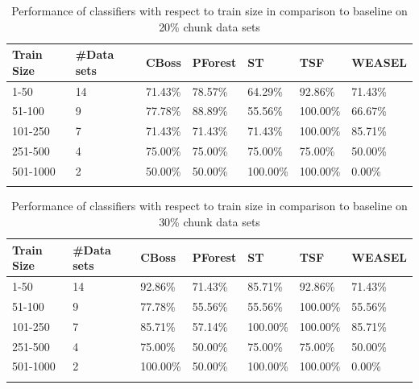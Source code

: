 \begin{table}[hp!]
	\setlength\extrarowheight{2pt} %
	\begin{tabularx}{\textwidth}{|X|X|X|X|X|X|X|}
	\hline
	\textbf{Train Size} & \textbf{\#Data sets} & \textbf{CBoss} & \textbf{PForest} & \textbf{ST} & \textbf{TSF} & \textbf{WEASEL} \\ \hline
		1-50 & 14 & 71.43\% & 78.57\% & 64.29\% & 92.86\% & 71.43\% \\ \hline
		51-100 & 9 & 77.78\% & 88.89\% & 55.56\% & 100.00\% & 66.67\% \\ \hline
		101-250 & 7 & 71.43\% & 71.43\% & 71.43\% & 100.00\% & 85.71\% \\ \hline
		251-500 & 4 & 75.00\% & 75.00\% & 75.00\% & 75.00\% & 50.00\% \\ \hline
		501-1000 & 2 &50.00\% & 50.00\% & 100.00\% & 100.00\% & 0.00\% \\ \hline
	\caption{Performance of classifiers with respect to train size in comparison to baseline on 20\% chunk data sets}
	\label{TableSize20}
  \end{tabularx}
\end{table}

\begin{table}[hp!]
	\setlength\extrarowheight{2pt} %
	\begin{tabularx}{\textwidth}{|X|X|X|X|X|X|X|}
	\hline
	\textbf{Train Size} & \textbf{\#Data sets} & \textbf{CBoss} & \textbf{PForest} & \textbf{ST} & \textbf{TSF} & \textbf{WEASEL} \\ \hline
		1-50 & 14 & 92.86\% & 71.43\% & 85.71\% & 92.86\% & 71.43\% \\ \hline
		51-100 & 9 & 77.78\% & 55.56\% & 55.56\% & 100.00\% & 55.56\% \\ \hline
		101-250 & 7 & 85.71\% & 57.14\% & 100.00\% & 100.00\% & 85.71\% \\ \hline
		251-500 & 4 & 75.00\% & 50.00\% & 75.00\% & 75.00\% & 50.00\% \\ \hline
		501-1000 & 2 &100.00\% & 50.00\% & 100.00\% & 100.00\% & 0.00\% \\ \hline
	\caption{Performance of classifiers with respect to train size in comparison to baseline on 30\% chunk data sets}
	\label{TableSize30}
  \end{tabularx}
\end{table}


